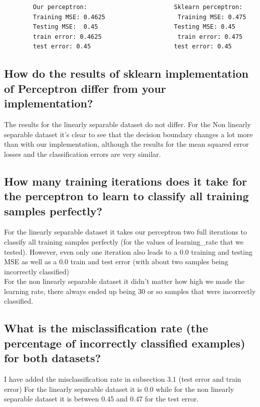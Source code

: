     \begin{verbatim}    
        Our perceptron:                        Sklearn perceptron:
        Training MSE: 0.4625                    Training MSE: 0.475
        Testing MSE:  0.45                     Testing MSE: 0.45
        train error: 0.4625                     train error: 0.475
        test error: 0.45                       test error: 0.45
    \end{verbatim}

    \subsection{How do the results of sklearn implementation of Perceptron differ from your implementation?}

    The results for the linearly separable dataset do not differ. For the Non linearly separable dataset it's clear to see that the decision boundary changes a lot more than with our implementation, although the results for the mean squared error losses and the classification errors are very similar.

    \subsection{How many training iterations does it take for the perceptron to learn to classify all training samples perfectly?}

    For the linearly separable dataset it takes our perceptron two full iterations to classify all training samples perfectly (for the values of learning\_rate that we tested). However, even only one iteration also leads to a 0.0 training and testing MSE as well as a 0.0 train and test error (with about two samples being incorrectly classified)\\
    For the non linearly separable dataset it didn't matter how high we made the learning rate, there always ended up being 30 or so samples that were incorrectly classified.

    \subsection{What is the misclassification rate (the percentage of incorrectly classified examples) for both datasets?}

    I have added the misclassification rate in subsection 3.1 (test error and train error)
    For the linearly separable dataset it is 0.0 while for the non linearly separable dataset it is between 0.45 and 0.47 for the test error.

